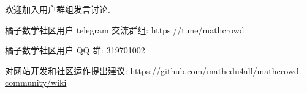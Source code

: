 \documentclass[a4paper,answers]{BHCexam}
\begin{document}
\begin{groups}
\begin{questions}[st]
\begin{solution}{4cm}
	\methodonly 欢迎加入用户群组发言讨论. 
	
橘子数学社区用户 telegram 交流群组: https://t.me/mathcrowd

橘子数学社区用户 QQ 群: 319701002


对网站开发和社区运作提出建议: \url{https://github.com/mathedu4all/mathcrowd-community/wiki}

	
\end{solution}
\end{questions}

\end{groups}
\end{document}
